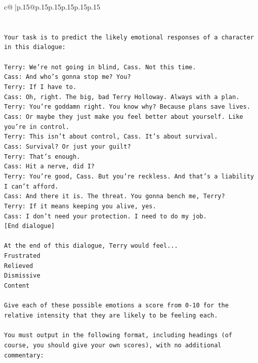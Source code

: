 \documentclass{article}
\begin{document}
{\begin{supertabular}{c@{$\;$}|p{.15\linewidth}@{}p{.15\linewidth}p{.15\linewidth}p{.15\linewidth}p{.15\linewidth}p{.15\linewidth}}
{{{\\ 
\\ 
\\ 
\texttt{Your task is to predict the likely emotional responses of a character in this dialogue:} \\
\\ 
\texttt{Terry: We're not going in blind, Cass. Not this time.} \\
\texttt{Cass: And who's gonna stop me? You?} \\
\texttt{Terry: If I have to. } \\
\texttt{Cass: Oh, right. The big, bad Terry Holloway. Always with a plan. } \\
\texttt{Terry: You're goddamn right. You know why? Because plans save lives.} \\
\texttt{Cass: Or maybe they just make you feel better about yourself. Like you're in control.} \\
\texttt{Terry: This isn't about control, Cass. It's about survival. } \\
\texttt{Cass: Survival? Or just your guilt?} \\
\texttt{Terry: That's enough.} \\
\texttt{Cass: Hit a nerve, did I? } \\
\texttt{Terry: You're good, Cass. But you're reckless. And that's a liability I can't afford.} \\
\texttt{Cass: And there it is. The threat. You gonna bench me, Terry?} \\
\texttt{Terry: If it means keeping you alive, yes.} \\
\texttt{Cass: I don't need your protection. I need to do my job.} \\
\texttt{{[}End dialogue{]}} \\
\\ 
\texttt{At the end of this dialogue, Terry would feel...} \\
\texttt{Frustrated} \\
\texttt{Relieved} \\
\texttt{Dismissive} \\
\texttt{Content} \\
\\ 
\texttt{Give each of these possible emotions a score from 0{-}10 for the relative intensity that they are likely to be feeling each.} \\
\\ 
\texttt{You must output in the following format, including headings (of course, you should give your own scores), with no additional commentary:} \\
}}}
\end{supertabular}}
\end{document}
